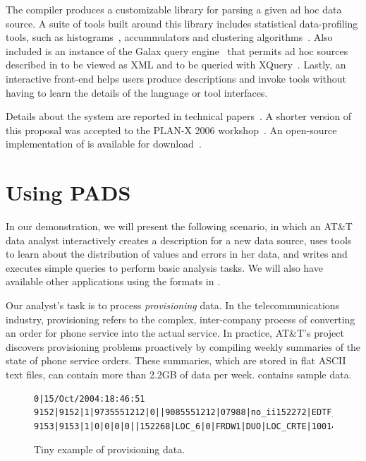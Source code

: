 The \pads{} compiler produces a customizable library for parsing a
given ad hoc data source.  A suite of tools built around this library
includes statistical data-profiling tools, such as
histograms~\cite{histograms}, accummulators and clustering
algorithms~\cite{quantiles}.  Also included is an instance of the
Galax query engine~\cite{galaxmanual} that permits ad hoc sources
described in \pads{} to be viewed as XML and to be queried with
XQuery~\cite{fernandez+:padx}.  Lastly, an interactive front-end helps
users produce \pads{} descriptions and invoke tools without having to
learn the details of the \pads{} language or tool interfaces.

Details about the \pads{} system are reported in technical
papers~\cite{fernandez+:padx,fisher+:pldi05,fisher+:popl06}.  A
shorter version of this proposal was accepted to the PLAN-X 2006
workshop~\cite{daly+:launchpads}.  An open-source implementation of
\pads{} is available for download~\cite{padsmanual}.
\section{Using PADS}
\label{subsec:example}

In our demonstration, we will present the following scenario, in which
an AT\&T data analyst interactively creates a \pads{} description for
a new data source, uses \pads{} tools to learn about the distribution
of values and errors in her data, and writes and executes simple
queries to perform basic analysis tasks.  We will also have available other
\pads{} applications using the formats in .

Our analyst's task is to process \textit{provisioning} data.  In the
telecommunications industry, {provisioning} refers to
the complex, inter-company process of converting an order for phone
service into the actual service.  In practice, AT\&T's \dibbler{}
project discovers provisioning problems proactively by compiling
weekly summaries of the state of phone service
orders.  These summaries, which are stored in flat ASCII text files,
can contain more than 2.2GB of data per
week.  contains sample \dibbler{} data.
\begin{figure}
\begin{small}
\begin{center}
\begin{verbatim}
0|15/Oct/2004:18:46:51
9152|9152|1|9735551212|0||9085551212|07988|no_ii152272|EDTF_6|0|APRL1|DUO|10|16/Oct/2004:10:02:10
9153|9153|1|0|0|0|0||152268|LOC_6|0|FRDW1|DUO|LOC_CRTE|1001476800|LOC_OS_10|17/Oct/2004:08:14:21
\end{verbatim}
\caption{Tiny example of \dibbler{} provisioning data.}
\label{figure:dibbler-records}
\end{center}
\end{small}
\end{figure}

